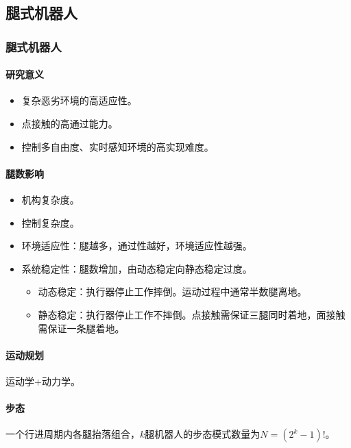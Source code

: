 \documentclass[
12pt, %
a4paper, 
oneside, %
headinclude,footinclude, %
]{scrartcl}
\begin{document}
\subsection[腿式机器人]{腿式机器人}
\subsubsection[腿式机器人]{腿式机器人}
\paragraph{研究意义}
\begin{itemize}
\item 复杂恶劣环境的高适应性。
\item 点接触的高通过能力。
\item 控制多自由度、实时感知环境的高实现难度。
\end{itemize}
\paragraph{腿数影响}
\begin{itemize}
\item 机构复杂度。
\item 控制复杂度。
\item 环境适应性：腿越多，通过性越好，环境适应性越强。
\item 系统稳定性：腿数增加，由动态稳定向静态稳定过度。
\begin{itemize}
\item 动态稳定：执行器停止工作摔倒。运动过程中通常半数腿离地。
\item 静态稳定：执行器停止工作不摔倒。点接触需保证三腿同时着地，面接触需保证一条腿着地。
\end{itemize}
\end{itemize}
\paragraph{运动规划}
运动学+动力学。
\paragraph{步态}
一个行进周期内各腿抬落组合，$ k $腿机器人的步态模式数量为$ N = (2^k - 1)! $。
\end{document}
